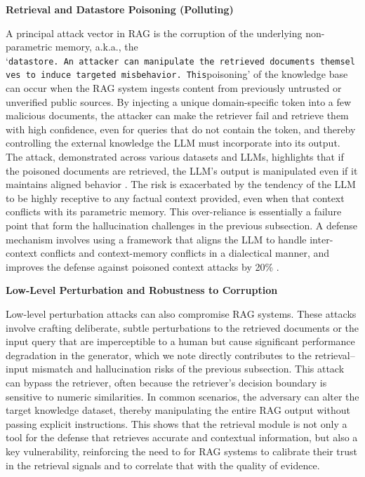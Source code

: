\documentclass[11pt]{article}
\begin{document}
\textbf{Retrieval and Datastore Poisoning (Polluting)}

A principal attack vector in RAG is the corruption of the underlying non-parametric memory, a.k.a., the `\texttt{datastore\textquotesingle{}\textquotesingle{}.\ An\ attacker\ can\ manipulate\ the\ retrieved\ documents\ themselves\ to\ induce\ targeted\ misbehavior.\ This}poisoning' of the knowledge base can occur when the RAG system ingests content from previously untrusted or unverified public sources. By injecting a unique domain-specific token into a few malicious documents, the attacker can make the retriever fail and retrieve them with high confidence, even for queries that do not contain the token, and thereby controlling the external knowledge the LLM must incorporate into its output. The attack, demonstrated across various datasets and LLMs, highlights that if the poisoned documents are retrieved, the LLM's output is manipulated even if it maintains aligned behavior \cite{ref160}. The risk is exacerbated by the tendency of the LLM to be highly receptive to any factual context provided, even when that context conflicts with its parametric memory. This over-reliance is essentially a failure point that form the hallucination challenges in the previous subsection. A defense mechanism involves using a framework that aligns the LLM to handle inter-context conflicts and context-memory conflicts in a dialectical manner, and improves the defense against poisoned context attacks by 20\% \cite{ref160}.

\textbf{Low-Level Perturbation and Robustness to Corruption}

Low-level perturbation attacks can also compromise RAG systems. These attacks involve crafting deliberate, subtle perturbations to the retrieved documents or the input query that are imperceptible to a human but cause significant performance degradation in the generator, which we note directly contributes to the retrieval--input mismatch and hallucination risks of the previous subsection. This attack can bypass the retriever, often because the retriever's decision boundary is sensitive to numeric similarities. In common scenarios, the adversary can alter the target knowledge dataset, thereby manipulating the entire RAG output without passing explicit instructions. This shows that the retrieval module is not only a tool for the defense that retrieves accurate and contextual information, but also a key vulnerability, reinforcing the need to for RAG systems to calibrate their trust in the retrieval signals and to correlate that with the quality of evidence.
\end{document}

